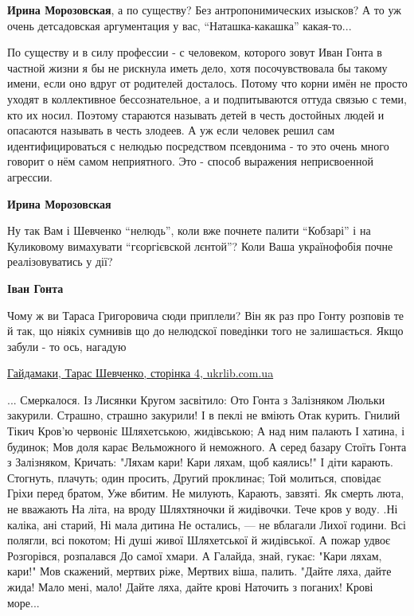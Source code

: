 \begin{itemize}
\begin{itemize}
\textbf{Ирина Морозовская}, а по существу? Без антропонимических изысков? А то уж очень детсадовская аргументация у вас, \enquote{Наташка-какашка} какая-то...


По существу и в силу профессии - с человеком, которого зовут Иван Гонта в
частной жизни я бы не рискнула иметь дело, хотя посочувствовала бы такому
имени, если оно вдруг от родителей досталось. Потому что корни имён не просто
уходят в коллективное бессознательное, а и подпитываются оттуда связью с теми,
кто их носил. Поэтому стараются называть детей в честь достойных людей и
опасаются называть в честь злодеев. А уж если человек решил сам
идентифицироваться с нелюдью посредством псевдонима - то это очень много
говорит о нём самом неприятного. Это - способ выражения неприсвоенной агрессии.

\textbf{Ирина Морозовская}

Ну так Вам і Шевченко \enquote{нелюдь}, коли вже почнете палити \enquote{Кобзарі} і на
Куликовому вимахувати \enquote{гєоргієвской лєнтой}? Коли Ваша українофобія почне
реалізовуватись у дії?


\textbf{Іван Гонта} 

Чому ж ви Тараса Григоровича сюди приплели? Він як раз про Гонту розповів те й
так, що ніякіх сумнивів що до нелюдскої поведінки того не залишається. Якщо
забули - то ось, нагадую

\href{https://www.ukrlib.com.ua/books/printit.php?tid=723&page=4}{%
Гайдамаки, Тарас Шевченко, сторінка 4, ukrlib.com.ua%
}

\begin{multicols}{2}
\obeycr
...
Смеркалося. Із Лисянки
Кругом засвітило:
Ото Гонта з Залізняком
Люльки закурили.
Страшно, страшно закурили!
І в пеклі не вміють
Отак курить. Гнилий Тікич
Кров'ю червоніє
Шляхетською, жидівською;
А над ним палають
І хатина, і будинок;
Мов доля карає
Вельможного й неможного.
А серед базару
Стоїть Гонта з Залізняком,
Кричать: "Ляхам кари!
Кари ляхам, щоб каялись!"
І діти карають.
Стогнуть, плачуть; один просить,
Другий проклинає;
Той молиться, сповідає
Гріхи перед братом,
Уже вбитим. Не милують,
Карають, завзяті.
Як смерть люта, не вважають
На літа, на вроду
Шляхтяночки й жидівочки.
Тече кров у воду.
.Ні каліка, ані старий,
Ні мала дитина
Не остались, — не вблагали
Лихої години.
Всі полягли, всі покотом;
Ні душі живої
Шляхетської й жидівської.
А пожар удвоє
Розгорівся, розпалався
До самої хмари.
А Галайда, знай, гукає:
"Кари ляхам, кари!"
Мов скажений, мертвих ріже,
Мертвих віша, палить.
"Дайте ляха, дайте жида!
Мало мені, мало!
Дайте ляха, дайте крові
Наточить з поганих!
Крові море...
\restorecr


\end{multicols}
\end{itemize}
\end{itemize}

